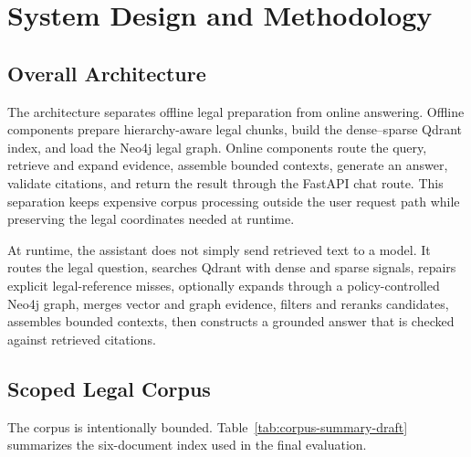 \section{System Design and Methodology}

\subsection{Overall Architecture}
The architecture separates offline legal preparation from online answering. Offline components prepare hierarchy-aware legal chunks, build the dense--sparse Qdrant index, and load the Neo4j legal graph. Online components route the query, retrieve and expand evidence, assemble bounded contexts, generate an answer, validate citations, and return the result through the FastAPI chat route. This separation keeps expensive corpus processing outside the user request path while preserving the legal coordinates needed at runtime.

At runtime, the assistant does not simply send retrieved text to a model. It routes the legal question, searches Qdrant with dense and sparse signals, repairs explicit legal-reference misses, optionally expands through a policy-controlled Neo4j graph, merges vector and graph evidence, filters and reranks candidates, assembles bounded contexts, then constructs a grounded answer that is checked against retrieved citations.


\subsection{Scoped Legal Corpus}
The corpus is intentionally bounded. Table~\ref{tab:corpus-summary-draft} summarizes the six-document index used in the final evaluation.

